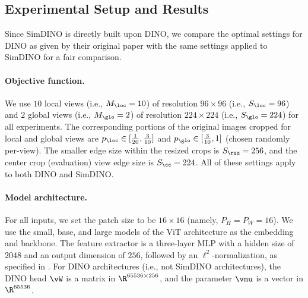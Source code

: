 \documentclass[../../book-main.tex]{subfiles}
\begin{document}
\subsection{Experimental Setup and Results} \label{sub:contrastive_learning_experiment_results}

Since SimDINO is directly built upon DINO, we compare the optimal settings for DINO as given by their original paper \citep{caron2021emerging} with the same settings applied to SimDINO for a fair comparison. 

\paragraph{Objective function.} We use \(10\) local views (i.e., \(M_{\loc} = 10\)) of resolution \(96 \times 96\) (i.e., \(S_{\loc} = 96\)) and \(2\) global views (i.e., \(M_{\glo} = 2\)) of resolution \(224 \times 224\) (i.e., \(S_{\glo} = 224\)) for all experiments. The corresponding portions of the original images cropped for local and global views are \(p_{\loc} \in [\frac{1}{20}, \frac{3}{10}]\) and \(p_{\glo} \in [\frac{3}{10}, 1]\) (chosen randomly per-view). The smaller edge size within the resized crops is \(S_{\rsz} = 256\), and the center crop (evaluation) view edge size is \(S_{\cc} = 224\). All of these settings apply to both DINO and SimDINO.

\paragraph{Model architecture.} For all inputs, we set the patch size to be \(16 \times 16\) (namely, \(P_{H} = P_{W} = 16\)). We use the small, base, and large models of the ViT \citep{dosovitskiy2020image} architecture as the embedding and backbone. The feature extractor is a three-layer MLP with a hidden size of \(2048\) and an output dimension of \(256\), followed by an \(\ell^{2}\)-normalization, as specified in . For DINO architectures (i.e., not SimDINO architectures), the DINO head \(\vW\) is a matrix in \(\R^{65536 \times 256}\), and the parameter \(\vmu\) is a vector in \(\R^{65536}\). 
\end{document}
